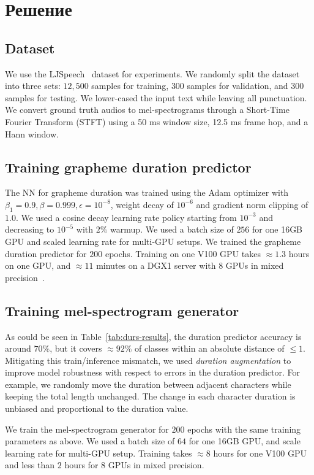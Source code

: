 \section{Решение}

\subsection{Dataset}

We use the LJSpeech~\cite{ljspeech} dataset for experiments.
We randomly split the dataset into three sets: $12,500$ samples for training, $300$ samples for validation, and $300$ samples for testing. We lower-cased the input text while leaving all punctuation. We convert ground truth audios to mel-spectrograms through a Short-Time Fourier Transform (STFT) using a 50 ms window size, 12.5 ms frame hop, and a Hann window.

\subsection{Training grapheme duration predictor}

The NN for grapheme duration was trained using the Adam optimizer with $\beta_1=0.9,\beta=0.999,\epsilon=10^{-8}$, weight decay of ${10}^{-6}$ and gradient norm clipping of $1.0$. We used a cosine decay learning rate policy starting from $10^{-3}$ and decreasing to $10^{-5}$ with $2\%$ warmup. We used a batch size of $256$ for one 16GB GPU and scaled learning rate for multi-GPU setups. We trained the grapheme duration predictor for $200$ epochs. Training on one V100 GPU takes $\approx 1.3$ hours on one GPU, and $\approx 11$ minutes on a DGX1 server with 8 GPUs in mixed precision~\cite{micikevicius}.

\subsection{Training mel-spectrogram generator}

As could be seen in Table~\ref{tab:durs-results}, the duration predictor accuracy is around $70\%$, but it covers $\approx 92\%$ of classes within an absolute distance of $\leq1$. Mitigating this train/inference mismatch, we used \textit{duration augmentation} to improve model robustness with respect to errors in the duration predictor. For example, we randomly move the duration between adjacent characters while keeping the total length unchanged. The change in each character duration is unbiased and proportional to the duration value.

We train the mel-spectrogram generator for $200$ epochs with the same training para\-meters as above. We used a batch size of $64$ for one 16GB GPU, and scale learning rate for multi-GPU setup. Training takes $\approx 8$ hours for one V100 GPU and less than $2$ hours for 8 GPUs in mixed precision.